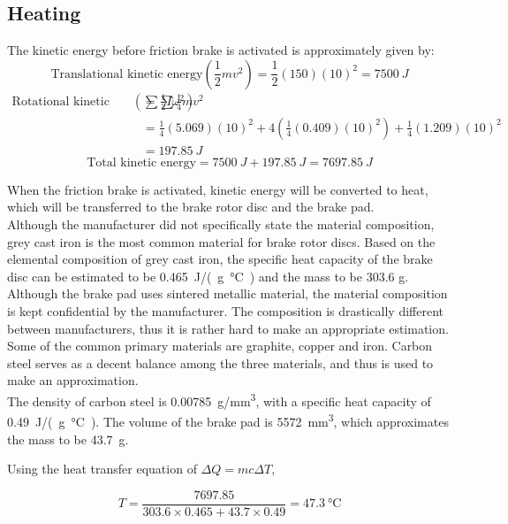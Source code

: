 \documentclass[main.tex]{subfiles}
\begin{document}
    \subsection{Heating}
    The kinetic energy before friction brake is activated is approximately given by:\\
    \[
    	\textrm{Translational kinetic energy} \left(\frac{1}{2}mv^2\right) =\frac{1}{2}(150)(10)^2=\SI{7500}{J}
    \]
    \begin{align*}
	\textrm{Rotational kinetic energy} \left(\sum\frac{1}{2}I{\omega}^2\right)&=\sum\frac{1}{4}mv^2 \\
    &= \frac{1}{4}(5.069)(10)^2 + 4\left(\frac{1}{4}(0.409)(10)^2\right) + \frac{1}{4}(1.209)(10)^2\\
    &= \SI{197.85}{J}
    \end{align*}
    \[
    	\textrm{Total kinetic energy} = \SI{7500}{J} + \SI{197.85}{J} = \SI{7697.85}{J}
    \]

    When the friction brake is activated, kinetic energy will be converted to heat, which will be transferred to the brake rotor disc and the brake pad.\\

    Although the manufacturer did not specifically state the material composition, grey cast iron is the most common material for brake rotor discs. Based on the elemental composition of grey cast iron, the specific heat capacity of the brake disc can be estimated to be \SI{0.465}{J/(g\celsius)} and the mass to be 303.6 g.\\

    Although the brake pad uses sintered metallic material, the material composition is kept confidential by the manufacturer. The composition is drastically different between manufacturers, thus it is rather hard to make an appropriate estimation. Some of the common primary materials are graphite, copper and iron. Carbon steel serves as a decent balance among the three materials, and thus is used to make an approximation.\\

    The density of carbon steel is \SI{0.00785}{g/mm^3}, with a specific heat capacity of \SI{0.49}{J/(g\celsius)}. The volume of the brake pad is \SI{5572}{mm^3}, which approximates the mass to be \SI{43.7}{g}.

    Using the heat transfer equation of $\Delta Q = mc \Delta T$,

    \begin{equation}
    	T=\frac{7697.85}{303.6 \times 0.465+43.7 \times 0.49}=\SI{47.3}{\celsius}
    \end{equation}
\end{document}
